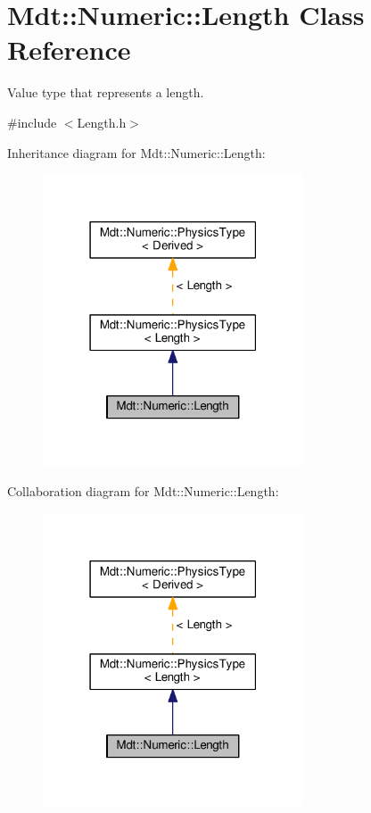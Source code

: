 \hypertarget{class_mdt_1_1_numeric_1_1_length}{}\section{Mdt\+:\+:Numeric\+:\+:Length Class Reference}
\label{class_mdt_1_1_numeric_1_1_length}


Value type that represents a length.  




{\ttfamily \#include $<$Length.\+h$>$}



Inheritance diagram for Mdt\+:\+:Numeric\+:\+:Length\+:\nopagebreak
\begin{figure}[H]
\begin{center}
\leavevmode
\includegraphics[width=219pt]{class_mdt_1_1_numeric_1_1_length__inherit__graph}
\end{center}
\end{figure}


Collaboration diagram for Mdt\+:\+:Numeric\+:\+:Length\+:\nopagebreak
\begin{figure}[H]
\begin{center}
\leavevmode
\includegraphics[width=219pt]{class_mdt_1_1_numeric_1_1_length__coll__graph}
\end{center}
\end{figure}
